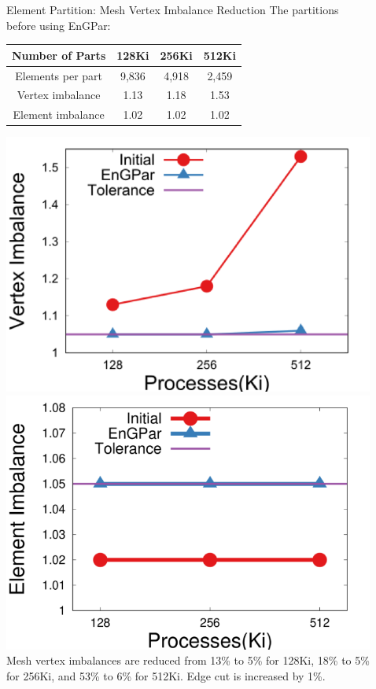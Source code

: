 \documentclass[final]{beamer}
\newlength{\sepwid}
\newlength{\onecolwid}
\begin{document}
\begin{frame}[t]
\begin{columns}[t]
\begin{column}{\onecolwid}
\begin{block}{Element Partition: Mesh Vertex Imbalance Reduction}
  The partitions before using EnGPar:\\
  \begin{table}[!h]
    \small
    \centering
    \begin{tabular}{||c|c|c|c||}
      \hline
      Number of Parts &128Ki&256Ki&512Ki \\
      \hline
      Elements per part & 9,836 & 4,918&2,459  \\
      \hline
      Vertex imbalance & 1.13 & 1.18 & 1.53 \\
      \hline
      Element imbalance & 1.02& 1.02& 1.02\\
      \hline
    \end{tabular}
  \end{table}
  {\centering
    \includegraphics[width=.6\textwidth]{../accelerated_cse19/figures/elmPtn_vtxImb.png}
    \includegraphics[width=.6\textwidth]{../accelerated_cse19/figures/elmPtn_elmImb.png} \\
    Mesh vertex imbalances are reduced from 13\% to 5\% for 128Ki, 18\% to 5\% for
    256Ki, and 53\% to 6\% for 512Ki.  Edge cut is increased by 1\%.
  }
\end{block}

\end{column} %
\begin{column}{\sepwid}\end{column} %
\begin{column}{\onecolwid} %


\end{column}
\end{columns}
\end{frame}
\end{document}
